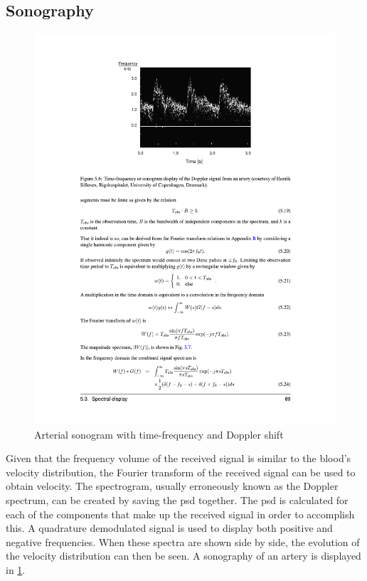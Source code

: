 \subsection{Sonography}
\begin{figure}[htbp]
	\centering
	\includegraphics[width=.8\textwidth]{Figures/2_estimation_sonogram_cph.pdf}
	\caption[Arterial sonogram with time-frequency and Doppler shift]{Arterial sonogram with time-frequency and Doppler shift \cite{JensenUltrasoundBook}}
	\label{fig:2_estimation_sonogram_cph}
\end{figure}

Given that the frequency volume of the received signal is similar to the blood's velocity distribution, the Fourier transform of the received signal can be used to obtain velocity. The spectrogram, usually erroneously known as the Doppler spectrum, can be created by saving the \gls{psd} together. The \gls{psd} is calculated for each of the components that make up the received signal in order to accomplish this. A quadrature demodulated signal is used to display both positive and negative frequencies. When these spectra are shown side by side, the evolution of the velocity distribution can then be seen. A sonography of an artery is displayed in \cref{fig:2_estimation_sonogram_cph}.
